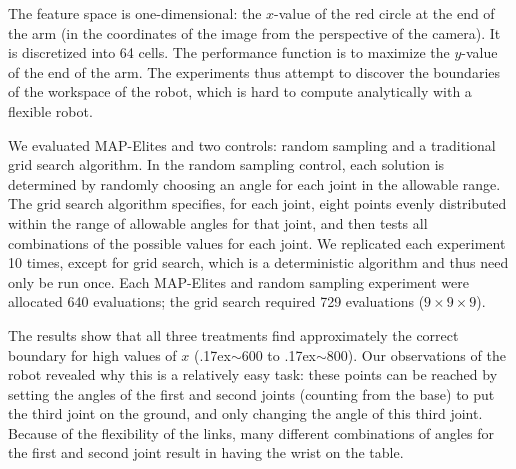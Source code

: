 \documentclass[twocolumn, DIV25, 9pt]{scrartcl}
\newcommand{\todoOfficialVersion}[1]{} %
\begin{document}
%
%

The feature space is one-dimensional: the $x$-value of the red circle at the end of the arm (in the coordinates of the image from the perspective of the camera). It is discretized into 64 cells. The performance function is to maximize the $y$-value of the end of the arm. The experiments thus attempt to discover the boundaries of the workspace of the robot, which is hard to compute analytically with a flexible robot.

We evaluated MAP-Elites and two controls:  random sampling and a traditional grid search algorithm. In the random sampling control, each solution is determined by randomly choosing an angle for each joint in the allowable range. The grid search algorithm specifies, for each joint, eight points evenly distributed within the range of allowable angles for that joint, and then tests all combinations of the possible values for each joint. We replicated each experiment 10 times, except for grid search, which is a deterministic algorithm and thus need only be run once. Each MAP-Elites and random sampling experiment were allocated 640 evaluations; the grid search required 729 evaluations ($9\times9\times9$).

The results show that all three treatments find approximately the correct boundary for high values of $x$ ({\raise.17ex\hbox{$\scriptstyle\sim$}}600 to {\raise.17ex\hbox{$\scriptstyle\sim$}}800). Our observations of the robot revealed why this is a relatively easy task: these points can be reached by setting the angles of the first and second joints (counting from the base) to put the third joint on the ground, and only changing the angle of this third joint. Because of the flexibility of the links, many different combinations of angles for the first and second joint result in having the wrist on the table.
\end{document}
